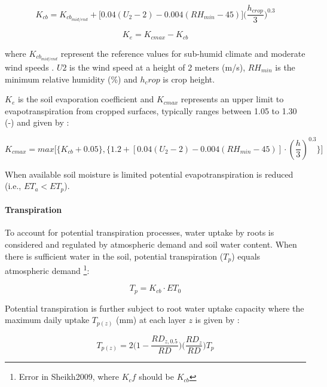 \documentclass[]{article}
\let\oldparagraph\paragraph
\renewcommand{\paragraph}[1]{\oldparagraph{#1}\mbox{}}
\let\rmarkdownfootnote\footnote%
\def\footnote{\protect\rmarkdownfootnote}
\begin{document}
\begin{equation}
K_{cb}=K_{cb_{mid/end}} + \Big[ 0.04(U_2-2)-0.004(RH_{min}-45) \Big] \Big( \frac{h_{crop}}{3} \Big) ^{0.3}
\label{eq:Kcb}  
\end{equation}

\begin{equation}
K_e= K_{cmax}-K_{cb}
\label{eq:Ke}  
\end{equation}

where \(K_{cb_{mid/end}}\) represent the reference values for sub-humid
climate and moderate wind speeds \citep[see][]{Allen1998}. \(U2\) is the
wind speed at a height of 2 meters (m/s), \(RH_{min}\) is the minimum
relative humidity (\%) and \(h_crop\) is crop height.

\(K_e\) is the soil evaporation coefficient and \(K_{cmax}\) represents
an upper limit to evapotranspiration from cropped surfaces, typically
ranges between 1.05 to 1.30 (-) and given by \citep{Sheikh2009}:

\begin{equation}
K_{cmax}=max \Big[ \Big\{ K_{cb}+0.05 \Big\} , \Big\{ 1.2 + [0.04(U_2-2)-0.004(RH_{min}-45)] \cdot (\frac{h}{3})^{0.3} \Big\} \Big]
\label{eq:Kcmax}  
\end{equation}

When available soil moisture is limited potential evapotranspiration is
reduced (i.e., \(ET_a < ET_p\)).

\paragraph{Transpiration}\label{transpiration}

To account for potential transpiration processes, water uptake by roots
is considered and regulated by atmospheric demand and soil water
content. When there is sufficient water in the soil, potential
transpiration (\(T_p\)) equals atmospheric demand
\citep{Sheikh2009}\footnote{Error in Sheikh2009, where $K_{c}f$ should be $K_{cb}$}:

\begin{equation}
T_p=K_{cb} \cdot ET_0
\label{eq:Tp}  
\end{equation}

Potential transpiration is further subject to root water uptake capacity
where the maximum daily uptake \(T_{p(z)}\) (mm) at each layer \(z\) is
given by \citep{Prasad1988}:

\begin{equation}
T_{p(z)} = 2 \Big( 1- \frac{RD_{z,0.5} }{RD} \Big) \Big( \frac{RD_z}{RD} \Big) T_p
\label{eq:Tpz}  
\end{equation}
\end{document}
